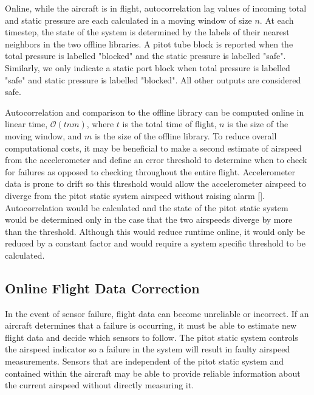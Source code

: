 \documentclass[]{aiaa-tc}
\begin{document}
Online, while the aircraft is in flight, autocorrelation lag values of incoming total and static pressure are each calculated in a moving window of size $n$. At each timestep, the state of the system is determined by the labels of their nearest neighbors in the two offline libraries. A pitot tube block is reported when the total pressure is labelled "blocked" and the static pressure is labelled "safe". Similarly, we only indicate a static port block when total pressure is labelled "safe" and static pressure is labelled "blocked". All other outputs are considered safe. 

Autocorrelation and comparison to the offline library can be computed online in linear time, $\mathcal{O}(t n  m)$, where $t$ is the total time of flight, $n$ is the size of the moving window, and $m$ is the size of the offline library. To reduce overall computational costs, it may be beneficial to make a second estimate of airspeed from the accelerometer and define an error threshold to determine when to check for failures as opposed to checking throughout the entire flight. Accelerometer data is prone to drift so this threshold would allow the accelerometer airspeed to diverge from the pitot static system airspeed without raising alarm []. Autocorrelation would be calculated and the state of the pitot static system would be determined only in the case that the two airspeeds diverge by more than the threshold. Although this would reduce runtime online, it would only be reduced by a constant factor and would require a system specific threshold to be calculated.




\subsection{Online Flight Data Correction}
\label{sec:flight correction}
In the event of sensor failure, flight data can become unreliable or incorrect. If an aircraft determines that a failure is occurring, it must be able to estimate new flight data and decide which sensors to follow. The pitot static system controls the airspeed indicator so a failure in the system will result in faulty airspeed measurements. Sensors that are independent of the pitot static system and contained within the aircraft may be able to provide reliable information about the current airspeed without directly measuring it. 
\end{document}
